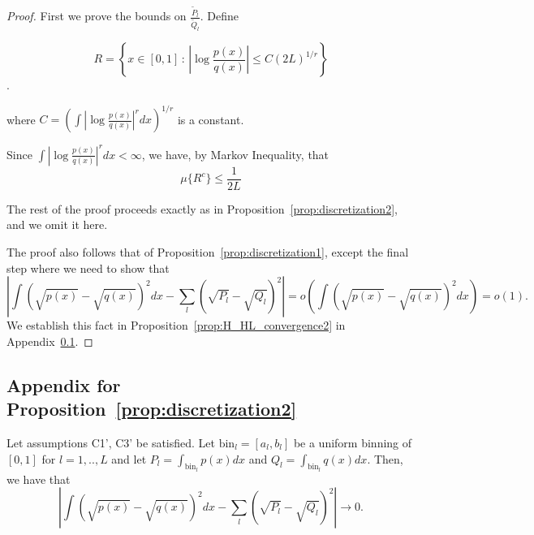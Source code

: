 \documentclass{article}
\newcommand{\bin}{\text{bin}}
\begin{document}
\begin{proof}


First we prove the bounds on $\frac{\tilde P_l}{\tilde Q_l}$. Define 

$$R = \left \{ x \in [0,1] \,:\, \left| \log \frac{p(x)}{q(x)} \right| \leq C (2L)^{1/r} \right \}$$. 

where $C = \left( \int \left| \log \frac{p(x)}{q(x)} \right|^r dx \right)^{1/r}$ is a constant. 

Since $\int \left| \log \frac{p(x)}{q(x)} \right|^r dx < \infty$, we have, by Markov Inequality, that
\[
\mu\{ R^c \} \leq \frac{1}{2L} 
\]

The rest of the proof proceeds exactly as in Proposition~\ref{prop:discretization2}, and we omit it here. 


The proof  also follows that of Proposition~\ref{prop:discretization1}, except the final step where we need to show that
$$\left| \int (\sqrt{p(x)} - \sqrt{q(x)})^2 dx - \sum_l (\sqrt{P_l} - \sqrt{Q_l})^2 \right| = o(\int (\sqrt{p(x)} - \sqrt{q(x)})^2 dx) = o(1).$$
We establish this fact in Proposition~\ref{prop:H_HL_convergence2} in Appendix~\ref{appendix: another saturday}.
\end{proof}


\subsection{Appendix for Proposition~\ref{prop:discretization2}} \label{appendix: another saturday}
\begin{proposition}
\label{prop:H_HL_convergence2}
Let assumptions C1', C3' be satisfied. Let $\bin_l = [a_l, b_l]$ be a uniform binning of $[0,1]$ for $l=1,..,L$ and let $P_l = \int_{\bin_l} p(x) dx$ and $Q_l = \int_{\bin_l} q(x) dx$. Then, we have that
\[
\left| \int (\sqrt{p(x)} - \sqrt{q(x)})^2 dx - \sum_l (\sqrt{P_l} - \sqrt{Q_l})^2 \right| \rightarrow 0.
\]
\end{proposition}
\end{document}
